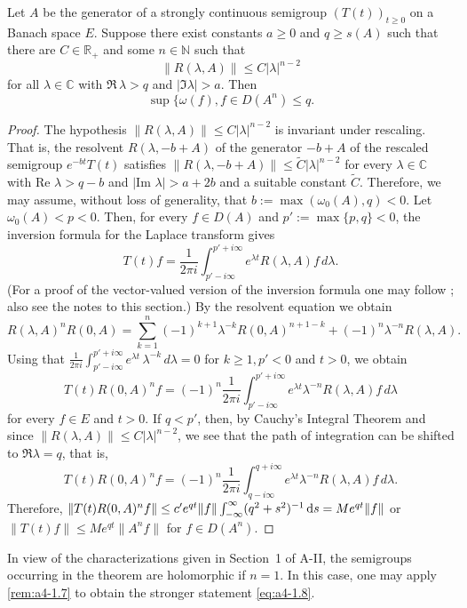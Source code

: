 \begin{theorem}\label{thm:a4-1.9} Let $A$ be the generator of a strongly continuous semigroup $(T(t))_{t \geq 0}$ on a Banach space $E$. 
Suppose there exist constants $a \geq 0$ and $q \geq s(A)$ such that there are $C \in \mathbb{R}_+$ and some $n \in \mathbb{N}$ such that 
    \[
    \| R(\lambda, A) \| \leq C | \lambda |^{n-2}
    \]
    for all $\lambda \in \mathbb{C}$ with $\Re\,\lambda > q$ and $| \Im \lambda | > a$. 
    Then
    \[
    \sup \{ \omega(f),  f \in D(A^n)  \leq q.\]
\end{theorem}

\begin{proof} 
The hypothesis $\| R(\lambda, A) \| \leq C | \lambda |^{n-2}$ is invariant under rescaling. 
That is, the resolvent $R(\lambda, -b+A)$ of the generator $-b+A$ of the rescaled semigroup $e^{-bt} T(t)$ satisfies  
$\| R(\lambda, -b+A) \| \leq \tilde{C} | \lambda |^{n-2}$ for every $\lambda \in \mathbb{C}$ with $\text{Re } \lambda > q-b$ and $| \text{Im } \lambda | > a+2b$ and a suitable constant $\tilde{C}$. 
Therefore, we may assume, without loss of generality, that $b := \max(\omega_0(A), q) < 0$. 
Let $\omega_0(A) < p < 0$. 
Then, for every $f \in D(A)$ and $p' := \max\{p, q\} < 0$, the inversion formula for the Laplace transform gives 
\begin{equation} \label{eq:a4-1.12}
T(t) f = \frac{1}{2\pi i} \int_{p' - i\infty}^{p' + i\infty} e^{\lambda t} R(\lambda, A) f \, d\lambda.
\end{equation}
 (For a proof of the vector-valued version of the inversion formula one may follow \citet[p.66]{widder:1946}; also see the notes to this section.)
By the resolvent equation we obtain 
   \[ R(\lambda, A)^n R(0, A) = \sum_{k=1}^{n} (-1)^{k+1} \lambda^{-k} R(0, A)^{n+1-k} + (-1)^n \lambda^{-n} R(\lambda, A).
   \]
  Using that  
$ \frac {1}{2\pi i} \int_{p' - i\infty}^{p' + i\infty} e^{\lambda t} \, \lambda^{-k} \, d\lambda = 0 $ for $ k \geq 1, p' < 0 $ and $ t > 0$, we obtain
 \begin{equation}\label{eq:a4-1.13}
   T(t) R(0, A)^n f = (-1)^n \frac{1}{2\pi i} \int_{p' - i\infty}^{p' + i\infty} e^{\lambda t} \lambda^{-n} R(\lambda, A) f \, d\lambda
    \end{equation}
 for every $f \in E$ and $t > 0$.
 If $q < p'$, then, by Cauchy's Integral Theorem and since $\| R(\lambda, A) \| \leq C | \lambda |^{n-2}$, we see that the path of integration can be shifted to $\Re \lambda = q$,
 that is,
    \[
    T(t) R(0, A)^n f = (-1)^n \frac{1}{2\pi i} \int_{q - i\infty}^{q + i\infty} e^{\lambda t} \lambda^{-n} R(\lambda, A) f \, d\lambda.
    \]
Therefore,  
$
\| T(t) R(0,A)^n f \| \leq c' e^{q t} \| f \| \int_{-\infty}^{\infty} (q^2 + s^2)^{-1}\mathop{}\!\mathrm{d}{s} = M e^{q t} \| f \|$ 
or 
$
\| T(t) f \| \leq M e^{q t} \| A^n f \|$ for $f \in D(A^n)$.
\end{proof}
In view of the characterizations given in Section~1 of A-II, the semigroups occurring in the theorem are holomorphic if $ n = 1 $. 
In this case, one may apply \eqref{rem:a4-1.7} to obtain the stronger statement \eqref{eq:a4-1.8}.

